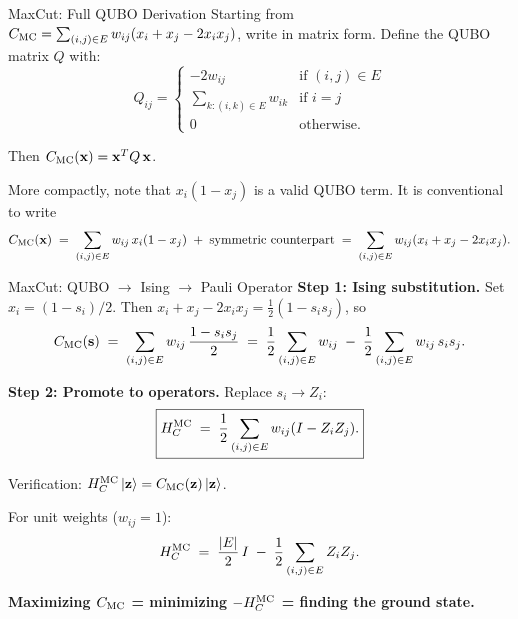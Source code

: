 \documentclass{beamer}
\begin{document}

\begin{frame}{MaxCut: Full QUBO Derivation}
Starting from $C_{\rm MC} = \sum_{(i,j)\in E}w_{ij}(x_i+x_j-2x_ix_j)$,
write in matrix form. Define the QUBO matrix $Q$ with:
\[
Q_{ij} = \begin{cases}
-2w_{ij} & \text{if }(i,j)\in E \\
\sum_{k:(i,k)\in E} w_{ik} & \text{if } i=j \\
0 & \text{otherwise.}
\end{cases}
\]

Then $C_{\rm MC}(\mathbf{x}) = \mathbf{x}^T Q\,\mathbf{x}$.

\medskip

More compactly, note that $x_i(1-x_j)$ is a valid QUBO term.
It is conventional to write
\[
C_{\rm MC}(\mathbf{x}) \;=\; \sum_{(i,j)\in E} w_{ij}\,x_i(1-x_j)
\;+\; \text{symmetric counterpart}
\;=\;\sum_{(i,j)\in E} w_{ij}(x_i + x_j - 2x_ix_j).
\]
\end{frame}


\begin{frame}{MaxCut: QUBO $\to$ Ising $\to$ Pauli Operator}
\textbf{Step 1: Ising substitution.} Set $x_i = (1-s_i)/2$. Then
$x_i + x_j - 2x_ix_j = \tfrac{1}{2}(1 - s_is_j)$, so
\[
C_{\rm MC}(\mathbf{s}) \;=\;
\sum_{(i,j)\in E} w_{ij}\,\frac{1-s_is_j}{2}
\;=\; \frac{1}{2}\sum_{(i,j)\in E}w_{ij}
\;-\; \frac{1}{2}\sum_{(i,j)\in E}w_{ij}\,s_is_j.
\]

\textbf{Step 2: Promote to operators.} Replace $s_i \to Z_i$:
\[
\boxed{
H_C^{\rm MC} \;=\; \frac{1}{2}\sum_{(i,j)\in E} w_{ij}(I - Z_iZ_j).}
\]

Verification: $H_C^{\rm MC}\ket{\mathbf{z}} = C_{\rm MC}(\mathbf{z})\ket{\mathbf{z}}$.

For unit weights ($w_{ij}=1$):
\[
H_C^{\rm MC} \;=\; \frac{|E|}{2}\,I \;-\; \frac{1}{2}\sum_{(i,j)\in E}Z_iZ_j.
\]

\textbf{Maximizing $C_{\rm MC}$ = minimizing $-H_C^{\rm MC}$ = finding
the ground state.}
\end{frame}

\end{document}
